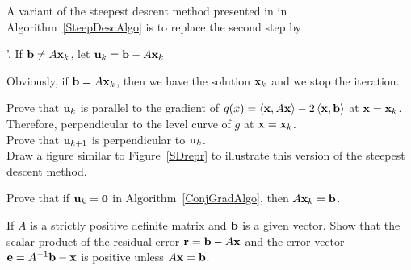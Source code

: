 \begin{question}
A variant of the steepest descent method presented in 
in Algorithm~\ref{SteepDescAlgo} is to replace the second step
by

'. If $\mathbf{b} \neq A\mathbf{x}_k$, let
$\mathbf{u}_k = \mathbf{b} - A\mathbf{x}_k$

Obviously, if $\mathbf{b} = A\mathbf{x}_k$, then we have the solution
$\mathbf{x}_k$ and we stop the iteration.

 Prove that $\mathbf{u}_k$ is parallel to the gradient of
$g(x) = \left\langle{\mathbf{x}} , {A\mathbf{x}}\right\rangle - 2 \left\langle{\mathbf{x}} , {\mathbf{b}}\right\rangle$ at $\mathbf{x}
= \mathbf{x}_k$.  Therefore, perpendicular to the level curve of $g$ at
$\mathbf{x} = \mathbf{x}_k$.\\
 Prove that $\mathbf{u}_{k+1}$ is perpendicular to $\mathbf{u}_k$.\\
 Draw a figure similar to Figure~\ref{SDrepr} to illustrate
this version of the steepest descent method.
\label{solvBQ15}
\end{question}

\begin{question}
Prove that if $\mathbf{u}_k=\mathbf{0}$ in Algorithm~\ref{ConjGradAlgo},
then $A\mathbf{x}_k = \mathbf{b}$.
\label{solvBQ16}
\end{question}

\begin{question}
If $A$ is a strictly positive definite matrix and $\mathbf{b}$ is a given
vector.  Show that the scalar product of the residual error
$\mathbf{r} = \mathbf{b} - A \mathbf{x}$ and the error vector
$\mathbf{e} = A^{-1}\mathbf{b} - \mathbf{x}$ is positive unless
$A\mathbf{x} = \mathbf{b}$.
\label{solvBQ17}
\end{question}

